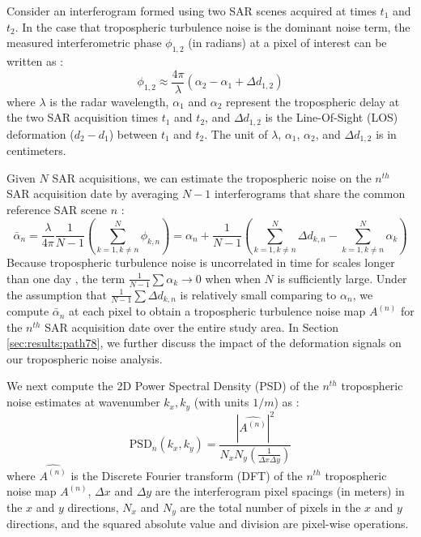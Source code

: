 	
	Consider an interferogram formed using two SAR scenes acquired at times $t_1$ and $t_2$. In the case that tropospheric turbulence noise is the dominant noise term, the measured interferometric phase $\phi_{1,2}$ (in radians) at a pixel of interest can be written as \cite{Zebker1997AtmosphericEffectsInterferometric}:
	\begin{equation}
		\phi_{1,2} \approx \frac{4 \pi}{\lambda} \left(\alpha_2 - \alpha_1 + \Delta d_{1,2} \right)
	\end{equation}
	where $ \lambda $ is the radar wavelength, $\alpha_1$ and $\alpha_2$ represent the tropospheric delay at the two SAR acquisition times $t_1$ and $t_2$, and $\Delta d_{1,2} $ is the Line-Of-Sight (LOS) deformation ($d_2-d_1$) between $t_1$ and $t_2$. The unit of $\lambda$, $\alpha_1$, $\alpha_2$, and $\Delta d_{1,2} $ is in centimeters. 
	
	Given $N$ SAR acquisitions, we can estimate the tropospheric noise on the $n^{th}$ SAR acquisition date by averaging $N-1$ interferograms that share the common reference SAR scene $n$ \cite{Tymofyeyeva2015MitigationAtmosphericPhase}:
	\begin{equation}
		\bar{\alpha}_n = \frac{\lambda}{4 \pi} \frac{1}{N-1} \left(\sum_{k=1, k \neq n}^{N} \phi_{k,n}\right)  =  \alpha_n  + \frac{1}{N-1} \left( \sum_{k=1, k \neq n}^{N}  \Delta d_{k,n} - \sum_{k=1, k \neq n}^{N}  \alpha_k  \right)  \label{eq:avg-ifg} 
	\end{equation}
	Because tropospheric turbulence noise is uncorrelated in time for scales longer than one day \cite{Emardson2003NeutralAtmosphericDelay, Onn2006ModelingWaterVapor}, the term $ \frac{1}{N-1} \sum \alpha_k \rightarrow 0$ when  when $N$ is sufficiently large. 
	Under the assumption that $ \frac{1}{N-1} \sum \Delta d_{k,n} $ is relatively small comparing to $\alpha_n$, we compute $ \bar{\alpha}_n $ at each pixel to obtain a tropospheric turbulence noise map $A^{(n)}$ for the $n^{th}$ SAR acquisition date over the entire study area. In Section \ref{sec:results:path78}, we further discuss the impact of the deformation signals on our tropospheric noise analysis.
	
	
	We next compute the 2D Power Spectral Density (PSD) of the $n^{th}$ tropospheric noise estimates at  wavenumber $ k_x, k_y $ (with units $1/m$) as \cite{Jacobs2017QuantitativeCharacterizationSurface}:
	\begin{equation}
		\text{PSD}_n(k_x, k_y) = \frac{| \widehat{A^{(n)}} |^2 }{N_x N_y (\frac{1}{\Delta x \Delta y}) } \label{eq:pow-spec}
	\end{equation}
	where  $\widehat{A^{(n)}}$ is the Discrete Fourier transform (DFT) of  the $n^{th}$ tropospheric noise map $A^{(n)}$, $\Delta x$ and $\Delta y$ are the interferogram pixel spacings (in meters) in the $x$ and $y$ directions, $N_x$ and $N_y$ are the total number of pixels in the $x$ and $y$ directions, and the squared absolute value and division are pixel-wise operations. 
	

